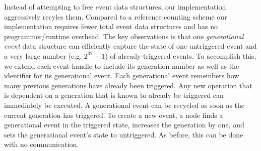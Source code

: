 Instead of attempting to free event data structures, our implementation aggressively recyles them.
Compared to a reference counting scheme our implementation requires fewer total event data structures
and has no programmer/runtime overhead.  The key observations is that one {\em generational event}
data structure can efficiently capture the state of one untriggered event and a very large 
number (e.g. $2^{32}-1$) of already-triggered events.  To accomplish this, we extend each event
handle to include its generation number as well as the identifier for its generational event.  Each
generational event remembers how many previous generations have already been triggered.  Any
new operation that is dependent on a generation that is known to already be triggered can immediately
be executed.  A generational event can be recycled as soon as the current generation has triggered. To
create a new event, a node finds a generational event in the triggered state,
increases the generation by one, and sets the generational event's state to untriggered.  As before, 
this can be done with no communication.

